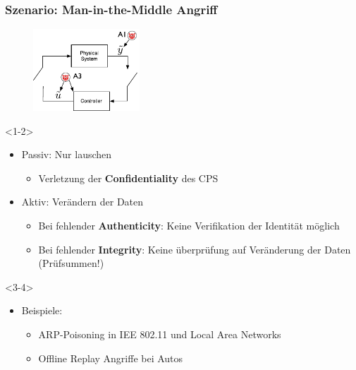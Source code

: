 \documentclass{sikslides}
\begin{document}
    \begin{frame}
        \frametitle{Szenario: Man-in-the-Middle Angriff}
        \begin{figure}
            \centering
            \includegraphics[width=4cm]{figure/mitm}
        \end{figure}
        \begin{onlyenv}<1-2>
            \begin{itemize}
                \item Passiv: Nur lauschen
                \begin{itemize}
                    \item Verletzung der \textbf{Confidentiality} des CPS
                    \pause
                \end{itemize}
                \item Aktiv: Verändern der Daten
                \begin{itemize}
                    \item Bei fehlender \textbf{Authenticity}: Keine Verifikation der Identität möglich
                    \item Bei fehlender \textbf{Integrity}: Keine überprüfung auf Veränderung der Daten (Prüfsummen!)
                \end{itemize}
                \pause
            \end{itemize}
        \end{onlyenv}

        \begin{onlyenv}<3-4>
            \begin{itemize}
                \item Beispiele:
                \begin{itemize}
                    \item ARP-Poisoning in IEE 802.11 und Local Area Networks
                    \pause
                    \item Offline Replay Angriffe bei Autos
                \end{itemize}
            \end{itemize}
        \end{onlyenv}

    \end{frame}
\end{document}

